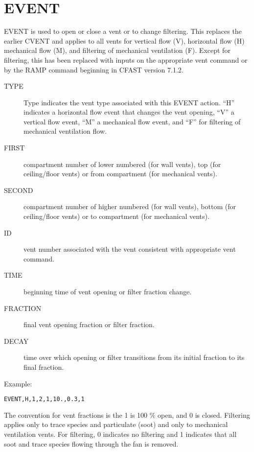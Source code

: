 \section{EVENT}

EVENT is used to open or close a vent or to change filtering. This replaces the earlier CVENT and applies to all vents for vertical flow (V), horizontal flow (H) mechanical flow (M), and filtering of mechanical ventilation (F). Except for filtering, this has been replaced with inputs on the appropriate vent command or by the RAMP command beginning in CFAST version 7.1.2.

\begin{adjustwidth}{1cm}{0cm}
\begin{description}
  \item[TYPE] Type indicates the vent type associated with this EVENT action. ``H'' indicates a horizontal flow event that changes the vent opening, ``V'' a vertical flow event, ``M'' a mechanical flow event, and ``F'' for filtering of mechanical ventilation flow.
  \item[FIRST] compartment number of lower numbered (for wall vents), top (for ceiling/floor vents) or from compartment (for mechanical vents).
  \item[SECOND] compartment number of higher numbered (for wall vents), bottom (for ceiling/floor vents) or to compartment (for mechanical vents).
  \item[ID] vent number associated with the vent consistent with appropriate vent command.
  \item[TIME] beginning time of vent opening or filter fraction change.
  \item[FRACTION] final vent opening fraction or filter fraction.
  \item[DECAY] time over which opening or filter transitions from its initial fraction to its final fraction.
\end{description}
\end{adjustwidth}

\noindent Example:

\begin{lstlisting}
EVENT,H,1,2,1,10.,0.3,1
\end{lstlisting}

The convention for vent fractions is the 1 is 100 \% open, and 0 is closed. Filtering applies only to trace species and particulate (soot) and only to mechanical ventilation vents. For filtering, 0 indicates no filtering and 1 indicates that all soot and trace species flowing through the fan is removed.

